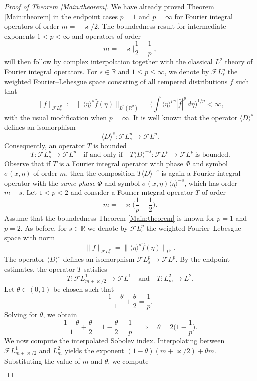 \documentclass[12pt, reqno]{amsart}
\theoremstyle{definition}
\theoremstyle{remark}
\numberwithin{equation}{section}
\begin{document}
\begin{proof}[Proof of Theorem \ref{Main:theorem}]
We have already proved Theorem \ref{Main:theorem} in the endpoint cases $p=1$ and $p=\infty$ for Fourier integral operators of order $m=-\varkappa/2$.  
The boundedness result for intermediate exponents $1<p<\infty$ and operators of
order
\[
m=-\varkappa\Big|\frac12-\frac1p\Big|,
\]
will then follow by complex interpolation together with the classical $L^2$
theory of Fourier integral operators.
For $s\in\mathbb{R}$ and $1\le p\le\infty$, we denote by $\mathcal{F}L^p_s$ the
weighted Fourier–Lebesgue space consisting of all tempered distributions $f$
such that
\[
\|f\|_{\mathcal{F}L^p_s}
:=\|\langle\eta\rangle^{s}\widehat f(\eta)\|_{L^p(\mathbb{R}^d)}=\bigg(\int\langle\eta\rangle^{ps}|\hat{f}|^p\,d\eta\bigg)^{1/p}<\infty,
\]
with the usual modification when $p=\infty$.
It is well known that the operator $\langle D\rangle^s$ defines an isomorphism
\[
\langle D\rangle^s:\mathcal{F}L^p_s\longrightarrow \mathcal{F}L^p.
\]
Consequently, an operator $T$ is bounded
\[
T:\mathcal{F}L^p_s\longrightarrow \mathcal{F}L^p
\quad\text{if and only if}\quad
T\langle D\rangle^{-s}:\mathcal{F}L^p\longrightarrow \mathcal{F}L^p
\ \text{is bounded}.
\]
Observe that if $T$ is a Fourier integral operator with phase $\Phi$ and symbol
$\sigma(x,\eta)$ of order $m$, then the composition $T\langle D\rangle^{-s}$ is
again a Fourier integral operator with the \emph{same phase} $\Phi$ and symbol
$\sigma(x,\eta)\langle\eta\rangle^{-s}$, which has order $m-s$.
Let $1<p<2$ and consider a Fourier integral operator $T$ of order
\[
m=-\varkappa\Big(\frac1p-\frac12\Big).
\]
Assume that the boundedness Theorem \ref{Main:theorem} is known for $p=1$ and $p=2$.
As before, for $s\in\mathbb{R}$ we denote by $\mathcal{F}L^p_s$ the weighted
Fourier–Lebesgue space with norm
\[
\|f\|_{\mathcal{F}L^p_s}
=\|\langle\eta\rangle^s\widehat f(\eta)\|_{L^p}.
\]
The operator $\langle D\rangle^s$ defines an isomorphism
$\mathcal{F}L^p_s \to \mathcal{F}L^p$.
By the endpoint estimates, the operator $T$ satisfies
\[
T:\mathcal{F}L^1_{m+\varkappa/2}\longrightarrow \mathcal{F}L^1
\quad\text{and}\quad
T:L^2_m\longrightarrow L^2.
\]
Let $\theta\in(0,1)$ be chosen such that
\[
\frac{1-\theta}{1}+\frac{\theta}{2}=\frac1p.
\]
Solving for $\theta$, we obtain
\[
\frac{1-\theta}{1}+\frac{\theta}{2}
=1-\frac{\theta}{2}
=\frac1p
\quad\Longrightarrow\quad
\theta=2\Big(1-\frac1p\Big).
\]
We now compute the interpolated Sobolev index.
Interpolating between $\mathcal{F}L^1_{m+\varkappa/2}$ and $L^2_m$ yields the exponent
$ 
(1-\theta)(m+\varkappa/2)+\theta m.
$ 
Substituting the value of $m$ and $\theta$, we compute
\begin{align*}

\end{align*}
\end{proof}
\end{document}
